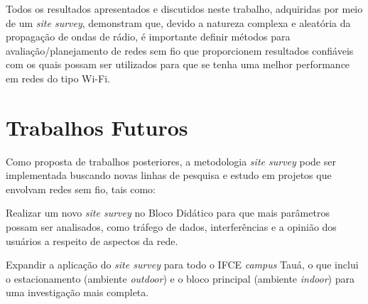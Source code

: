 Todos os resultados apresentados e discutidos neste trabalho, adquiridas por meio de um \textit{site survey}, demonstram que, devido a natureza complexa e aleatória da propagação de ondas de rádio, é importante definir métodos para avaliação/planejamento de redes sem fio que proporcionem resultados confiáveis com os quais possam ser utilizados para que se tenha uma melhor performance em redes do tipo Wi-Fi.

\section{Trabalhos Futuros}
\label{sec:trabalhos-futuros}

Como proposta de trabalhos posteriores, a metodologia \textit{site survey} pode ser implementada buscando novas linhas de pesquisa e estudo em projetos que envolvam redes sem fio, tais como:

\begin{compactitem}
	\item Realizar um novo \textit{site survey} no Bloco Didático para que mais parâmetros possam ser analisados, como tráfego de dados, interferências e a opinião dos usuários a respeito de aspectos da rede.
	
	
	\item Expandir a aplicação do \textit{site survey} para todo o IFCE \textit{campus} Tauá, o que inclui o estacionamento (ambiente \textit{outdoor}) e o bloco principal (ambiente \textit{indoor}) para uma investigação mais completa.
\end{compactitem}


